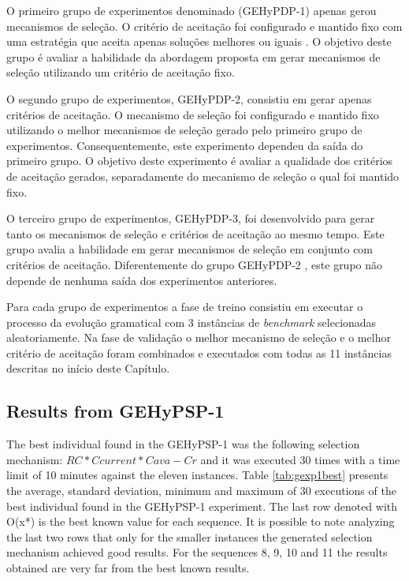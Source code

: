O primeiro grupo de experimentos denominado (GEHyPDP-1) apenas gerou mecanismos de seleção. O critério de aceitação foi configurado e mantido fixo com uma estratégia que aceita apenas soluções melhores ou iguais \cite{burke2013hyper}. O objetivo deste grupo é avaliar a habilidade da abordagem proposta em gerar mecanismos de seleção utilizando um critério de aceitação fixo.

	O segundo grupo de experimentos, GEHyPDP-2, consistiu em gerar apenas critérios de aceitação. O mecanismo de seleção foi configurado e mantido fixo utilizando o melhor mecanismos de seleção gerado pelo primeiro grupo de experimentos. Consequentemente, este experimento dependeu da saída do primeiro grupo. O objetivo deste experimento é avaliar a qualidade dos critérios de aceitação gerados, separadamente do mecanismo de seleção o qual foi mantido fixo.
	
	O terceiro grupo de experimentos,  GEHyPDP-3, foi desenvolvido para gerar tanto os mecanismos de seleção e critérios de aceitação ao mesmo tempo. Este grupo avalia a habilidade em gerar mecanismos de seleção em conjunto com critérios de aceitação. Diferentemente do grupo GEHyPDP-2  , este grupo não depende de nenhuma saída dos experimentos anteriores.

	Para cada grupo de experimentos a fase de treino consistiu em executar o processo da evolução gramatical com 3 instâncias de \textit{benchmark} selecionadas aleatoriamente. Na fase de validação o melhor mecanismo de seleção e o melhor critério de aceitação foram combinados e executados com todas as 11 instâncias descritas no início deste Capítulo. 
	

	
	
	\subsection{Results from GEHyPSP-1}
	
	The best individual found in the GEHyPSP-1 was the following selection mechanism:  $RC * Ccurrent * Cava - Cr$ and it was executed 30 times with a time limit of 10 minutes against the eleven instances. Table \ref{tab:gexp1best}  presents the average, standard deviation, minimum and maximum of 30 executions of the best individual found in the GEHyPSP-1 experiment. The last row denoted with O(x*) is the best known value for each sequence. It is possible to note analyzing the last two rows that only for the smaller instances the generated selection mechanism achieved good results. For the sequences 8, 9, 10 and 11 the results obtained are very far from the best known results.
	
